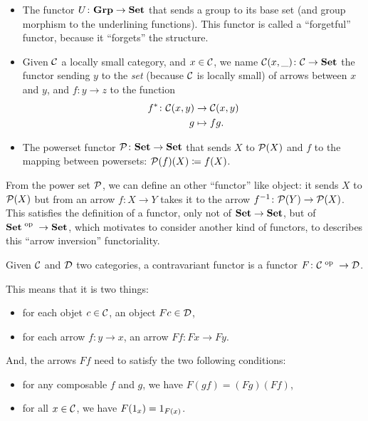 \documentclass[a4paper]{article}
\theoremstyle { remark }
\theoremstyle { definition }
\newtheorem { definition } { Definition }
\newtheorem { example } { Example }
\theoremstyle { plain }
\begin{document}
\begin{example} \label{ex:some-functors}
\leavevmode %

\begin{itemize}
  \item The functor \( U \colon  \mathbf { Grp }  \to  \mathbf { Set }  \) that sends a group to its base set (and group morphism to the underlining functions).
    This functor is called a \enquote{forgetful} functor, because it \enquote{forgets} the structure.
  \item Given \(  \mathcal { C }  \) a locally small category, and \( x \in  \mathcal { C }  \), we name \(  \mathcal { C } (x, \_) \colon  \mathcal { C }  \to  \mathbf { Set }  \) the functor sending \( y \) to the \emph{set} (because \(  \mathcal { C }  \) is locally small) of arrows between \( x \) and \( y \), and \( f \colon y \to z \) to the function
    \begin{align*}
      f^{*} \colon  \mathcal { C } (x,y) &\to  \mathcal { C } (x,y) \\
                    g &\mapsto fg.
    \end{align*}
  \item The powerset functor \(  \mathcal { P }  \colon  \mathbf { Set }  \to  \mathbf { Set }  \) that sends \( X \) to \(  \mathcal { P } (X) \) and \( f \) to the mapping between powersets: \(  \mathcal { P } (f)(X) \coloneqq f(X) \).
\end{itemize}

From the power set \(  \mathcal { P }  \), we can define an other \enquote{functor} like object: it sends \( X \) to \(  \mathcal { P } (X) \) but from an arrow \( f \colon X \to Y \) takes it to the arrow \( f^{-1} \colon  \mathcal { P } (Y) \to  \mathcal { P } (X) \).
This satisfies the definition of a functor, only not of \(  \mathbf { Set }  \to  \mathbf { Set }  \), but of \(  { \mathbf { Set } } ^ \text { op }  \to  \mathbf { Set }  \), which motivates to consider another kind of functors, to describes this \enquote{arrow inversion} functoriality.
\end{example}
 
\begin{definition}
Given \(  \mathcal { C }  \) and \(  \mathcal { D }  \) two categories, a contravariant functor is a functor \( F \colon  { \ensuremath { \mathcal { C } } } ^ \text { op }  \to  \mathcal { D }  \).

This means that it is two things: 
\begin{itemize}
  \item for each objet \( c \in  \mathcal { C }  \), an object \( F c \in  \mathcal { D }  \),
  \item for each arrow \( f \colon y \to x \), an arrow \( F f \colon F x \to F y \).
\end{itemize}

And, the arrows \( F f \) need to satisfy the two following conditions:
\begin{itemize}
  \item for any composable \( f \) and \( g \), we have \( F (gf) = (F g) (F f) \),
  \item for all \( x \in  \mathcal { C }  \), we have \( F(\one[x]) = \one[F(x)] \).
\end{itemize}
\end{definition}
\end{document}

